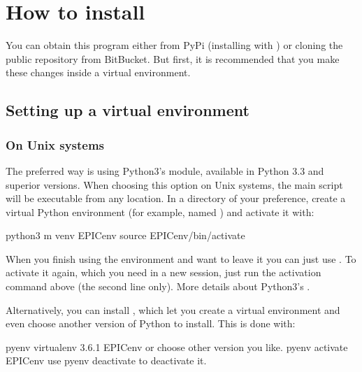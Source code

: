 \documentclass[letterpaper,12pt,english]{sphinxhowto}
\begin{document}
\section{How to install}
\label{\detokenize{howtoinstall:how-to-install}}\label{\detokenize{howtoinstall::doc}}
You can obtain this program either from PyPi (installing with ) or cloning the public repository from BitBucket.
But first, it is recommended that you make these changes inside a
virtual environment.


\subsection{Setting up a virtual environment}
\label{\detokenize{howtoinstall:setting-up-a-virtual-environment}}

\subsubsection{On Unix systems}
\label{\detokenize{howtoinstall:on-unix-systems}}
The preferred way is using Python3’s  module, available in Python 3.3
and superior versions.
When choosing this option on Unix systems, the main script  will be
executable from any location.
In a directory of your preference, create a virtual Python environment (for
example, named ) and activate it with:

%
\begin{sphinxVerbatim}[commandchars=\\\{\}]
\PYGZdl{} python3 \PYGZhy{}m venv EPIC\PYGZhy{}env
\PYGZdl{} source EPIC\PYGZhy{}env/bin/activate
\end{sphinxVerbatim}

When you finish using the environment and want to leave it you can just use
.
To activate it again, which you need in a new session, just run the activation
command above (the second line only).
More details about Python3’s 
.

Alternatively, you can install
, which let you create
a virtual environment and even choose another version of Python to install.
This is done with:

%
\begin{sphinxVerbatim}[commandchars=\\\{\}]
\PYGZdl{} pyenv virtualenv 3.6.1 EPIC\PYGZhy{}env \PYGZsh{} or choose other version you like.
\PYGZdl{} pyenv activate EPIC\PYGZhy{}env \PYGZsh{} use \PYGZsq{}pyenv deactivate\PYGZsq{} to deactivate it.
\end{sphinxVerbatim}
\end{document}
